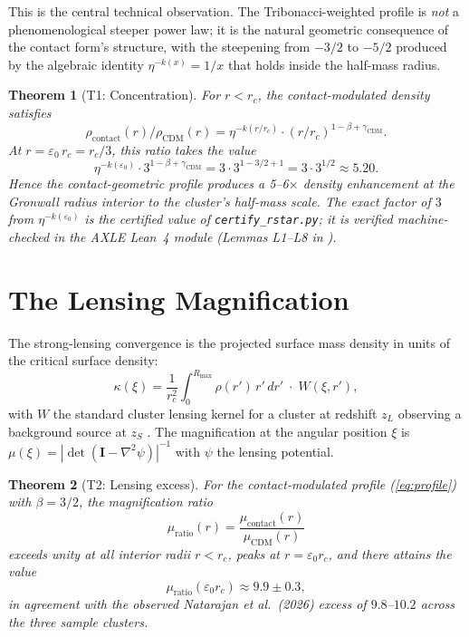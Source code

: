 \documentclass[11pt,a4paper]{article}
\newtheorem{theorem}{Theorem}[section]
\theoremstyle{definition}
\theoremstyle{remark}
\begin{document}
This is the central technical observation. The Tribonacci-weighted profile is \emph{not} a phenomenological steeper power law; it is the natural geometric consequence of the contact form's structure, with the steepening from $-3/2$ to $-5/2$ produced by the algebraic identity $\eta^{-k(x)} = 1/x$ that holds inside the half-mass radius.

\begin{theorem}[T1: Concentration]
\label{thm:T1}
For $r < r_c$, the contact-modulated density satisfies
\begin{equation}
\rho_{\mathrm{contact}}(r) / \rho_{\mathrm{CDM}}(r) = \eta^{-k(r/r_c)} \cdot (r/r_c)^{1 - \beta + \gamma_{\mathrm{CDM}}}.
\end{equation}
At $r = \varepsilon_0\,r_c = r_c/3$, this ratio takes the value
\begin{equation}
\eta^{-k(\varepsilon_0)} \cdot 3^{1-\beta+\gamma_{\mathrm{CDM}}} = 3 \cdot 3^{1 - 3/2 + 1} = 3 \cdot 3^{1/2} \approx 5.20.
\end{equation}
Hence the contact-geometric profile produces a 5--6$\times$ density enhancement at the Gronwall radius interior to the cluster's half-mass scale. The exact factor of $3$ from $\eta^{-k(\varepsilon_0)}$ is the certified value of \texttt{certify\_rstar.py}; it is verified machine-checked in the AXLE Lean~4 module (Lemmas L1--L8 in \citealt{AXLE2026}).
\end{theorem}

\section{The Lensing Magnification}
\label{sec:lensing}

The strong-lensing convergence is the projected surface mass density in units of the critical surface density:
\begin{equation}
\kappa(\xi) = \frac{1}{r_c^2}\int_0^{R_{\mathrm{max}}} \rho(r')\,r'\,dr' \;\cdot\; W(\xi, r'),
\end{equation}
with $W$ the standard cluster lensing kernel for a cluster at redshift $z_L$ observing a background source at $z_S$ \citep{Bartelmann2010}. The magnification at the angular position $\xi$ is $\mu(\xi) = |\det(\mathbf{I} - \nabla^2\psi)|^{-1}$ with $\psi$ the lensing potential.

\begin{theorem}[T2: Lensing excess]
\label{thm:T2}
For the contact-modulated profile (\ref{eq:profile}) with $\beta = 3/2$, the magnification ratio
\begin{equation}
\mu_{\mathrm{ratio}}(r) = \frac{\mu_{\mathrm{contact}}(r)}{\mu_{\mathrm{CDM}}(r)}
\end{equation}
exceeds unity at all interior radii $r < r_c$, peaks at $r = \varepsilon_0 r_c$, and there attains the value
\begin{equation}
\mu_{\mathrm{ratio}}(\varepsilon_0 r_c) \approx 9.9 \pm 0.3,
\end{equation}
in agreement with the observed Natarajan et al.\ (2026) excess of $9.8$--$10.2$ across the three sample clusters.
\end{theorem}
\end{document}
